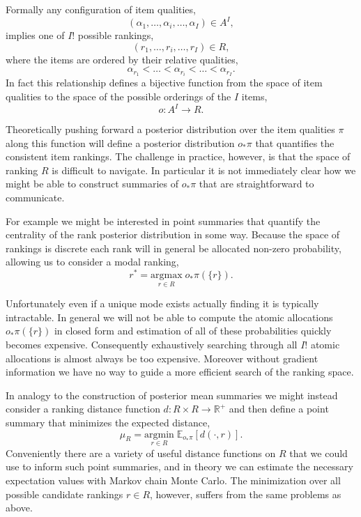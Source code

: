 \documentclass[
  letterpaper,
  DIV=11,
  numbers=noendperiod]{scrartcl}
\begin{document}
Formally any configuration of item qualities, \[
( \alpha_{1}, \ldots, \alpha_{i}, \ldots, \alpha_{I} ) \in A^{I},
\] implies one of \(I!\) possible rankings, \[
(r_{1}, \ldots, r_{i}, \ldots, r_{I}) \in R,
\] where the items are ordered by their relative qualities, \[
\alpha_{r_{1}} < \ldots <
\alpha_{r_{i}} < \ldots <
\alpha_{r_{I}}.
\] In fact this relationship defines a bijective function from the space
of item qualities to the space of the possible orderings of the \(I\)
items, \[
o : A^{I} \rightarrow R.
\]

Theoretically pushing forward a posterior distribution over the item
qualities \(\pi\) along this function will define a posterior
distribution \(o_{*} \pi\) that quantifies the consistent item rankings.
The challenge in practice, however, is that the space of ranking \(R\)
is difficult to navigate. In particular it is not immediately clear how
we might be able to construct summaries of \(o_{*} \pi\) that are
straightforward to communicate.

For example we might be interested in point summaries that quantify the
centrality of the rank posterior distribution in some way. Because the
space of rankings is discrete each rank will in general be allocated
non-zero probability, allowing us to consider a modal ranking, \[
r^{*} = \underset{r \in R}{\mathrm{argmax}} \; o_{*} \pi( \{ r \} ).
\]

Unfortunately even if a unique mode exists actually finding it is
typically intractable. In general we will not be able to compute the
atomic allocations \(o_{*} \pi( \{ r \} )\) in closed form and
estimation of all of these probabilities quickly becomes expensive.
Consequently exhaustively searching through all \(I!\) atomic
allocations is almost always be too expensive. Moreover without gradient
information we have no way to guide a more efficient search of the
ranking space.

In analogy to the construction of posterior mean summaries we might
instead consider a ranking distance function
\(d : R \times R \rightarrow \mathbb{R}^{+}\) and then define a point
summary that minimizes the expected distance, \[
\mu_{R}
=
\underset{r \in R}{\mathrm{argmin}} \;
\mathbb{E}_{o_{*} \pi}[ d( \cdot, r) ].
\] Conveniently there are a variety of useful distance functions on
\(R\) that we could use to inform such point summaries, and in theory we
can estimate the necessary expectation values with Markov chain Monte
Carlo. The minimization over all possible candidate rankings
\(r \in R\), however, suffers from the same problems as above.
\end{document}
